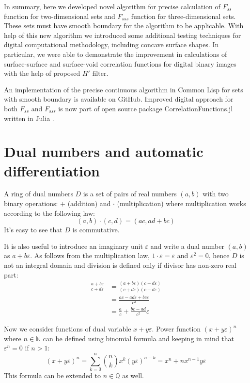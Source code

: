 \documentclass[preprint]{elsarticle}
\begin{document}
In summary, here we developed novel algorithm for precise calculation of
$F_{ss}$ function for two-dimensional sets and $F_{sss}$ function for
three-dimensional sets. These sets must have smooth boundary for the algorithm
to be applicable. With help of this new algorithm we introduced some additional
testing techniques for digital computational methodology, including concave
surface shapes.  In particular, we were able to demonstrate the improvement in
calculations of surface-surface and surface-void correlation functions for
digital binary images with the help of proposed $H'$ filter.

An implementation of the precise continuous algorithm in Common Lisp for sets
with smooth boundary is available on GitHub\cite{diff-boundary-corrfn}. Improved
digital approach for both $F_{ss}$ and $F_{sss}$ is now part of open source
package CorrelationFunctions.jl written in Julia \cite{CFs.jl}.

\appendix
\section{Dual numbers and automatic differentiation}
\label{sec:dual}
A ring of dual numbers $D$ is a set of pairs of real numbers $(a, b)$ with two
binary operations: $+$ (addition) and $\cdot$ (multiplication) where
multiplication works according to the following law:
\begin{equation}
  (a, b)\cdot(c, d) = (ac, ad + bc)
\end{equation}
It's easy to see that $D$ is commutative.

It is also useful to introduce an imaginary unit $\varepsilon$ and write a dual
number $(a, b)$ as $a + b\varepsilon$. As follows from the multiplication law,
$1\cdot \varepsilon = \varepsilon$ and $\varepsilon^2 = 0$, hence $D$ is not an
integral domain and division is defined only if divisor has non-zero real part:
\begin{equation}
  \begin{aligned}
    \frac{a+b\varepsilon}{c+d\varepsilon} &=
    \frac{(a+b\varepsilon)(c-d\varepsilon)}{(c+d\varepsilon)(c-d\varepsilon)} \\
    &= \frac{ac-ad\varepsilon+bc\varepsilon}{c^2} \\
    &= \frac{a}{c} + \frac{bc-ad}{c^2}\varepsilon
  \end{aligned}
\end{equation}

Now we consider functions of dual variable $x + y\varepsilon$. Power function
$(x + y\varepsilon)^n$ where $n \in \mathbb{N}$ can be defined using binomial
formula and keeping in mind that $\varepsilon^n = 0$ if $n>1$:
\begin{equation}
  (x + y\varepsilon)^n = \sum_{k=0}^n \binom{n}{k} x^k (y\varepsilon)^{n-k} =
  x^n + n x^{n-1} y \varepsilon
\end{equation}
This formula can be extended to $n \in \mathbb{Q}$ as well.
\end{document}
